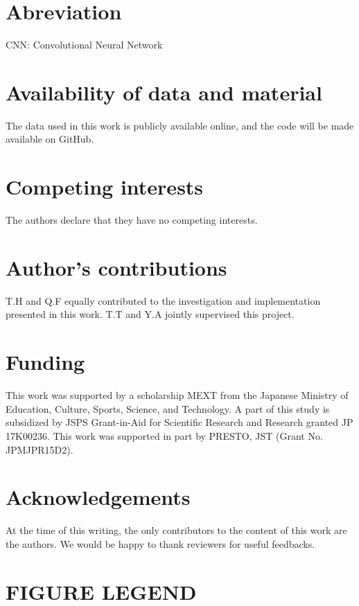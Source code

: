 \documentclass[twocolumn]{bmcart}
\begin{document}
\section*{Abreviation}

CNN: Convolutional Neural Network  \\

\begin{backmatter}
\section*{Availability of data and material}
The data used in this work is publicly available online, and the code will be made available on GitHub.

\section*{Competing interests}
The authors declare that they have no competing interests.

\section*{Author's contributions}
T.H and Q.F equally contributed to the investigation and implementation presented in this work. T.T and Y.A jointly supervised this project.

\section*{Funding}
This work was supported by a scholarship MEXT from the Japanese Ministry of Education, Culture, Sports, Science, and Technology. 
A part of this study is subsidized by JSPS Grant-in-Aid for Scientific Research and Research granted JP 17K00236. 
This work was supported in part by PRESTO, JST (Grant No. JPMJPR15D2).

\section*{Acknowledgements}
At the time of this writing, the only contributors to the content of this work are the authors. We would be happy to thank reviewers for useful feedbacks.




\section*{FIGURE LEGEND}


\end{backmatter}
\end{document}
